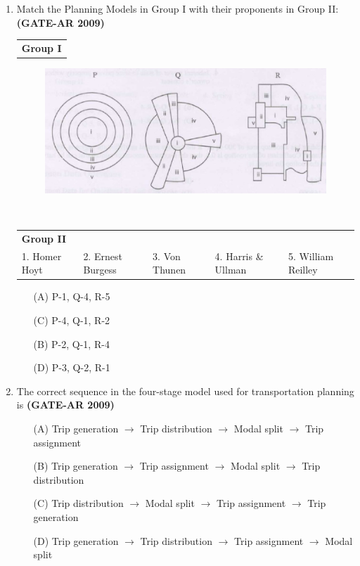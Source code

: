 \documentclass[a4paper,10pt]{article}
\begin{document}
\begin{enumerate}
    \item Match the Planning Models in Group I with their proponents in Group II: \hfill \textbf{(GATE-AR 2009)} \\
    \begin{tabular}{ p{\dimexpr\columnwidth-2\tabcolsep} }
	\textbf{Group I} \\
	\end{tabular}
	\begin{figure}[h!]
        \centering
        \includegraphics[width=0.5\linewidth]{figs/img_03.jpg}
        \label{fig:Img03}
	\end{figure} \\
	\begin{tabular}{ p{\dimexpr\columnwidth-2\tabcolsep} p{\dimexpr\columnwidth-2\tabcolsep} p{\dimexpr\columnwidth-2\tabcolsep} p{\dimexpr\columnwidth-2\tabcolsep} p{\dimexpr\columnwidth-2\tabcolsep} }
	\textbf{Group II} & & \\
	1. Homer Hoyt & 2. Ernest Burgess & 3. Von Thunen & 4. Harris \& Ullman & 5. William Reilley \\
	\end{tabular}
	\begin{multicols}{2}
	\begin{itemize}
        \item[(A)] P-1, Q-4, R-5
        \item[(C)] P-4, Q-1, R-2
        \item[(B)] P-2, Q-1, R-4
        \item[(D)] P-3, Q-2, R-1
    \end{itemize}
	\end{multicols}

    \item The correct sequence in the four-stage model used for transportation planning is \hfill \textbf{(GATE-AR 2009)}
    \begin{itemize}
        \item[(A)] Trip generation $\to$ Trip distribution $\to$ Modal split $\to$ Trip assignment
        \item[(B)] Trip generation $\to$ Trip assignment $\to$ Modal split $\to$ Trip distribution
        \item[(C)] Trip distribution $\to$ Modal split $\to$ Trip assignment $\to$ Trip generation
        \item[(D)] Trip generation $\to$ Trip distribution $\to$ Trip assignment $\to$ Modal split
    \end{itemize}


\end{enumerate}
\end{document}
